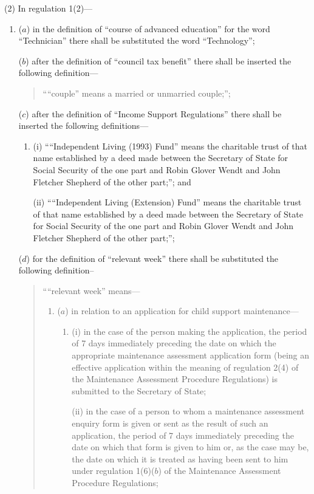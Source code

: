 \documentclass[12pt,a4paper]{article}
\begin{document}
(2) In regulation 1(2)---
\begin{enumerate}\item[]
($a$) in the definition of “course of advanced education” for the word “Technician” there shall be substituted the word “Technology”;

($b$) after the definition of “council tax benefit” there shall be inserted the following definition---
\begin{quotation}
““couple” means a married or unmarried couple;”;
\end{quotation}

($c$) after the definition of “Income Support Regulations” there shall be inserted the following definitions---
\begin{enumerate}\item[]
(i) ““Independent Living (1993) Fund” means the charitable trust of that name established by a deed made between the Secretary of State for Social Security of the one part and Robin Glover Wendt and John Fletcher Shepherd of the other part;”; and

(ii) ““Independent Living (Extension) Fund” means the charitable trust of that name established by a deed made between the Secretary of State for Social Security of the one part and Robin Glover Wendt and John Fletcher Shepherd of the other part;”;
\end{enumerate}

($d$) for the definition of “relevant week” there shall be substituted the following definition–
\begin{quotation}
““relevant week” means---
\begin{enumerate}\item[]
($a$) in relation to an application for child support maintenance\hspace{0pt}---
\begin{enumerate}\item[]
(i) in the case of the person making the application, the period of 7 days immediately preceding the date on which the appropriate maintenance assessment application form (being an effective application within the meaning of regulation 2(4) of the Maintenance Assessment Procedure Regulations) is submitted to the Secretary of State;

(ii) in the case of a person to whom a maintenance assessment enquiry form is given or sent as the result of such an application, the period of 7 days immediately preceding the date on which that form is given to him or, as the case may be, the date on which it is treated as having been sent to him under regulation 1(6)($b$) of the Maintenance Assessment Procedure Regulations;
\end{enumerate}


\end{enumerate}
\end{quotation}
\end{enumerate}
\end{document}
